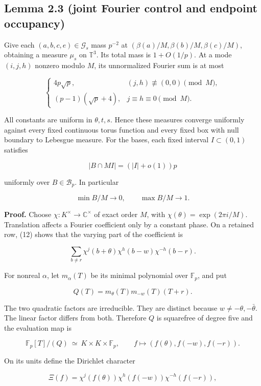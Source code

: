 \documentclass[11pt,a4paper]{article}
\begin{document}
\subsection{Lemma 2.3 (joint Fourier control and endpoint occupancy)}\label{lemma-2.3-joint-fourier-control-and-endpoint-occupancy}

Give each \((a,b,c,e)\in\mathcal G_s\) mass \(p^{-2}\) at \((\beta(a)/M,\beta(b)/M,\beta(c)/M)\), obtaining a measure \(\mu_s\) on \(\mathbb T^3\). Its total mass is \(1+O(1/p)\). At a mode \((i,j,h)\) nonzero modulo \(M\), its unnormalized Fourier sum is at most

\[\begin{cases}
4p\sqrt p,&(j,h)\not\equiv(0,0)\pmod M,\\
(p-1)(\sqrt p+4),&j\equiv h\equiv0\pmod M.
\end{cases}
\tag{13}\]

All constants are uniform in \(\theta,t,s\). Hence these measures converge uniformly against every fixed continuous torus function and every fixed box with null boundary to Lebesgue measure. For the bases, each fixed interval \(I\subset(0,1)\) satisfies

\[|B\cap MI|=(|I|+o(1))p
\tag{14}\]

uniformly over \(B\in\mathcal B_p\). In particular

\[\min B/M\to0,\qquad\max B/M\to1.
\tag{15}\]

\textbf{Proof.} Choose \(\chi:K^{\times}\to\mathbb C^{\times}\) of exact order \(M\), with \(\chi(\theta)=\exp(2\pi i/M)\). Translation affects a Fourier coefficient only by a constant phase. On a retained row, (12) shows that the varying part of the coefficient is

\[\sum_{b\ne r}\chi^j(b+\theta)\chi^h(b-w)\chi^{-h}(b-r).
\tag{16}\]

For nonreal \(\alpha\), let \(m_\alpha(T)\) be its minimal polynomial over \(\mathbb F_p\), and put

\[Q(T)=m_\theta(T)m_{-w}(T)(T+r).
\tag{17}\]

The two quadratic factors are irreducible. They are distinct because \(w\ne-\theta,-\bar\theta\). The linear factor differs from both. Therefore \(Q\) is squarefree of degree five and the evaluation map is

\[\mathbb F_p[T]/(Q)\ \simeq\ K\times K\times\mathbb F_p,
\qquad f\longmapsto(f(\theta),f(-w),f(-r)).\]

On its units define the Dirichlet character

\[\Xi(f)=\chi^j(f(\theta))\chi^h(f(-w))\chi^{-h}(f(-r)),\]
\end{document}
